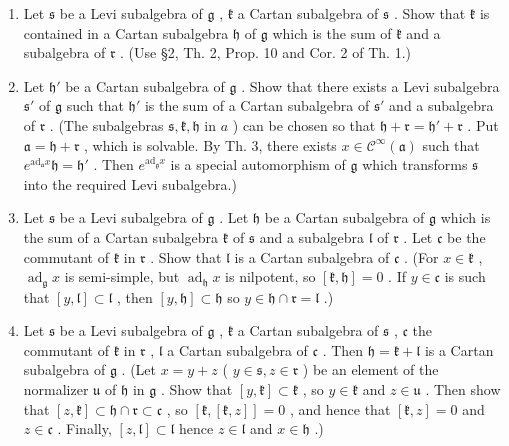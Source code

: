 \begin{enumerate}
\def\labelenumi{\alph{enumi})}
\item
  Let \(\mathfrak{s}\) be a Levi subalgebra of \(\mathfrak{g}\) , \(\mathfrak{k}\) a Cartan subalgebra of \(\mathfrak{s}\) . Show that \(\mathfrak{k}\) is contained in a Cartan subalgebra \(\mathfrak{h}\) of \(\mathfrak{g}\) which is the sum of \(\mathfrak{k}\) and a subalgebra of \(\mathfrak{r}\) . (Use §2, Th. 2, Prop. 10 and Cor. 2 of Th. 1.)
\item
  Let \(\mathfrak{h}'\) be a Cartan subalgebra of \(\mathfrak{g}\) . Show that there exists a Levi subalgebra \(\mathfrak{s}'\) of \(\mathfrak{g}\) such that \(\mathfrak{h}'\) is the sum of a Cartan subalgebra of \(\mathfrak{s}'\) and a subalgebra of \(\mathfrak{r}\) . (The subalgebras \(\mathfrak{s}, \mathfrak{k}, \mathfrak{h}\) in \(a\) ) can be chosen so that \(\mathfrak{h} + \mathfrak{r} = \mathfrak{h}' + \mathfrak{r}\) . Put \(\mathfrak{a} = \mathfrak{h} + \mathfrak{r}\) , which is solvable. By Th. 3, there exists \(x \in \mathcal{C}^{\infty}(\mathfrak{a})\) such that \(e^{\mathrm{ad}_{\mathfrak{a}}x}\mathfrak{h} = \mathfrak{h}'\) . Then \(e^{\mathrm{ad}_{\mathfrak{g}}x}\) is a special automorphism of \(\mathfrak{g}\) which transforms \(\mathfrak{s}\) into the required Levi subalgebra.)
\item
  Let \(\mathfrak{s}\) be a Levi subalgebra of \(\mathfrak{g}\) . Let \(\mathfrak{h}\) be a Cartan subalgebra of \(\mathfrak{g}\) which is the sum of a Cartan subalgebra \(\mathfrak{k}\) of \(\mathfrak{s}\) and a subalgebra \(\mathfrak{l}\) of \(\mathfrak{r}\) . Let \(\mathfrak{c}\) be the commutant of \(\mathfrak{k}\) in \(\mathfrak{r}\) . Show that \(\mathfrak{l}\) is a Cartan subalgebra of \(\mathfrak{c}\) . (For \(x \in \mathfrak{k}\) , \(\operatorname{ad}_{\mathfrak{g}} x\) is semi-simple, but \(\operatorname{ad}_{\mathfrak{h}} x\) is nilpotent, so \([\mathfrak{k}, \mathfrak{h}] = 0\) . If \(y \in \mathfrak{c}\) is such that \([y, \mathfrak{l}] \subset \mathfrak{l}\) , then \([y, \mathfrak{h}] \subset \mathfrak{h}\) so \(y \in \mathfrak{h} \cap \mathfrak{r} = \mathfrak{l}\) .)
\item
  Let \(\mathfrak{s}\) be a Levi subalgebra of \(\mathfrak{g}\) , \(\mathfrak{k}\) a Cartan subalgebra of \(\mathfrak{s}\) , \(\mathfrak{c}\) the commutant of \(\mathfrak{k}\) in \(\mathfrak{r}\) , \(\mathfrak{l}\) a Cartan subalgebra of \(\mathfrak{c}\) . Then \(\mathfrak{h} = \mathfrak{k} + \mathfrak{l}\) is a Cartan subalgebra of \(\mathfrak{g}\) . (Let \(x = y + z\) ( \(y \in \mathfrak{s}, z \in \mathfrak{r}\) ) be an element of the normalizer \(\mathfrak{u}\) of \(\mathfrak{h}\) in \(\mathfrak{g}\) . Show that \([y, \mathfrak{k}] \subset \mathfrak{k}\) , so \(y \in \mathfrak{k}\) and \(z \in \mathfrak{u}\) . Then show that \([z, \mathfrak{k}] \subset \mathfrak{h} \cap \mathfrak{r} \subset \mathfrak{c}\) , so \([\mathfrak{k}, [\mathfrak{k}, z]] = 0\) , and hence that \([\mathfrak{k}, z] = 0\) and \(z \in \mathfrak{c}\) . Finally, \([z, \mathfrak{l}] \subset \mathfrak{l}\) hence \(z \in \mathfrak{l}\) and \(x \in \mathfrak{h}\) .)

\end{enumerate}
